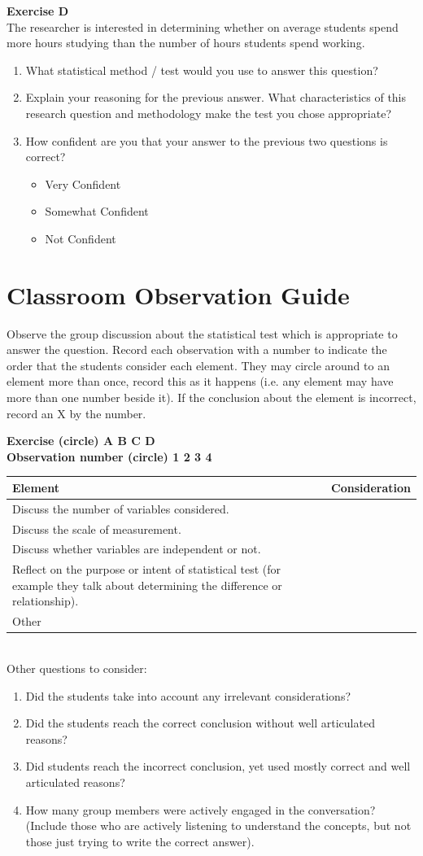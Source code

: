 \documentclass[12pt]{article}
\newcommand{\bi}{\begin{itemize}}
\newcommand{\ei}{\end{itemize}}
\newcommand{\be}{\begin{enumerate}}
\newcommand{\ee}{\end{enumerate}}
\newcommand{\appsection}[1]
{
\let\oldthesection\thesection
\renewcommand{\thesection}{Appendix \oldthesection}
\section{#1}\let\thesection\oldthesection
\renewcommand{\theequation}{\thesection\arabic{equation}}
\setcounter{equation}{0}
}
\begin{document}
\noindent \textbf{Exercise D}\\
The researcher is interested in determining whether on average students spend more hours studying than the number of hours students spend working.
\be
\item What statistical method / test would you use to answer this question?
\item Explain your reasoning for the previous answer.  What characteristics of this research question and methodology make the test you chose appropriate?
\item How confident are you that your answer to the previous two questions is correct?  
\bi \item Very Confident \item Somewhat Confident \item Not Confident \ei
\ee

\newpage
\appsection{Classroom Observation Guide}
Observe the group discussion about the statistical test which is appropriate to answer the question. Record each observation with a number to indicate the order that the students consider each element. They may circle around to an element more than once, record this as it happens (i.e. any element may have more than one number beside it). If the conclusion about the element is incorrect, record an X by the number. 

\noindent \textbf{Exercise (circle) A B C D} \\
\noindent \textbf{Observation number (circle) 1 2 3 4} \\

\begin{tabular}{|p{4.5in}|l|} \hline
Element & Consideration \\ \hline
Discuss the number of variables considered. & \\ \hline
Discuss the scale of measurement. & \\ \hline
Discuss whether variables are independent or not. & \\ \hline
Reflect on the purpose or intent of statistical test (for example they talk about determining the difference or relationship). & \\ \hline
Other & \\ \hline
\end{tabular} \\

\noindent Other questions to consider: 
\be
\item Did the students take into account any irrelevant considerations?
\item Did the students reach the correct conclusion without well articulated reasons?
\item Did students reach the incorrect conclusion, yet used mostly correct and well articulated reasons?
\item How many group members were actively engaged in the conversation? (Include those who are actively listening to understand the concepts, but not those just trying to write the correct answer).
\ee
\end{document}
